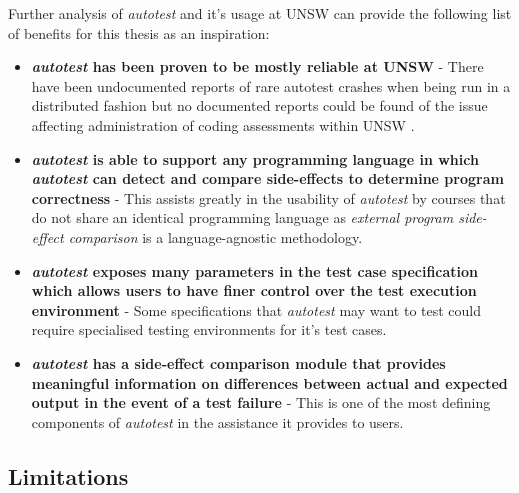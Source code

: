 \documentclass[hidelinks]{report}
\begin{document}
Further analysis of \textit{autotest} and it's usage at UNSW can provide the following list of benefits for this thesis as an inspiration:
\begin{itemize}
	\item \textbf{\textit{autotest} has been proven to be mostly reliable at UNSW} - There have been undocumented reports of rare autotest crashes when being run in a distributed fashion but no documented reports could be found of the issue affecting administration of coding assessments within UNSW \cite{AutotestConversation}.
	\item \textbf{\textit{autotest} is able to support any programming language in which \textit{autotest} can detect and compare side-effects to determine program correctness} - This assists greatly in the usability of \textit{autotest} by courses that do not share an identical programming language as \textit{external program side-effect comparison} is a language-agnostic methodology.
	\item \textbf{\textit{autotest} exposes many parameters in the test case specification which allows users to have finer control over the test execution environment} - Some specifications that \textit{autotest} may want to test could require specialised testing environments for it's test cases.
	\item \textbf{\textit{autotest} has a side-effect comparison module that provides meaningful information on differences between actual and expected output in the event of a test failure} - This is one of the most defining components of \textit{autotest} in the assistance it provides to users.
\end{itemize} 

\subsection{Limitations}
\end{document}
